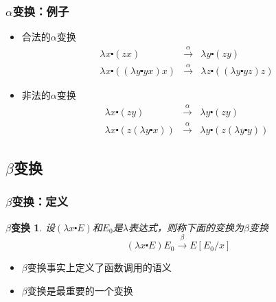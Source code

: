 \documentclass[CJK,compress,hyperref]{beamer}
\begin{document}
\begin{CJK}{UTF8}{song}
\begin{frame}
  \frametitle{$\alpha$变换：例子} 
  \begin{itemize}
  \item 合法的$\alpha$变换 
    \begin{eqnarray*}
      \lambda x \centerdot (zx) & \stackrel{\alpha}{\longrightarrow} & \lambda y \centerdot (zy) \\ 
      \lambda x \centerdot ((\lambda y \centerdot yx) x) & \stackrel{\alpha}{\longrightarrow} & \lambda z  \centerdot ((\lambda y \centerdot yz) z) 
    \end{eqnarray*}
  \item 非法的$\alpha$变换
    \begin{eqnarray*}      
      \lambda x \centerdot (zy) & \stackrel{\alpha}{\longrightarrow} &  \lambda y \centerdot (zy) \\
      \lambda x \centerdot (z (\lambda y \centerdot x))  & \stackrel{\alpha}{\longrightarrow} & \lambda y \centerdot (z (\lambda y \centerdot y)) 
    \end{eqnarray*}
  \end{itemize}
\end{frame} 

\subsection{ $\beta$变换}
\begin{frame}
  \frametitle{$\beta$变换：定义} 
  \newtheorem{betaRed}{$\beta$变换}
  \begin{betaRed}
    设$(\lambda x \centerdot E)$和$E_0$是$\lambda$表达式，则称下面的变换为{\color{red}$\beta$变换}
    \begin{displaymath}
      (\lambda x \centerdot E)E_0 \stackrel{\beta}{\longrightarrow} E[E_0/x] 
    \end{displaymath} 
  \end{betaRed}
  \begin{itemize}
  \item $\beta$变换事实上定义了{\color{red}函数调用}的语义 
  \item $\beta$变换是最重要的一个变换
  \end{itemize}
\end{frame} 


\end{CJK}
\end{document}
